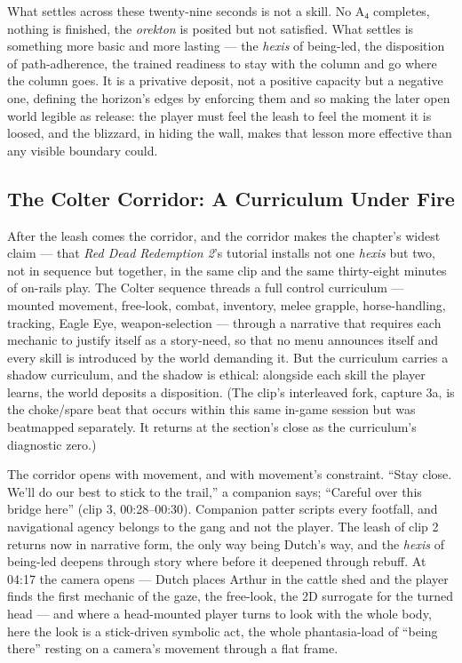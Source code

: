 \documentclass{article}
\begin{document}
What settles across these twenty-nine seconds is not a skill. No A₄ completes, nothing is finished, the \textit{orekton} is posited but not satisfied. What settles is something more basic and more lasting — the \textit{hexis} of being-led, the disposition of path-adherence, the trained readiness to stay with the column and go where the column goes. It is a privative deposit, not a positive capacity but a negative one, defining the horizon's edges by enforcing them and so making the later open world legible as release: the player must feel the leash to feel the moment it is loosed, and the blizzard, in hiding the wall, makes that lesson more effective than any visible boundary could.

\bigskip

\subsection*{The Colter Corridor: A Curriculum Under Fire}

After the leash comes the corridor, and the corridor makes the chapter's widest claim — that \textit{Red Dead Redemption 2}'s tutorial installs not one \textit{hexis} but two, not in sequence but together, in the same clip and the same thirty-eight minutes of on-rails play. The Colter sequence threads a full control curriculum — mounted movement, free-look, combat, inventory, melee grapple, horse-handling, tracking, Eagle Eye, weapon-selection — through a narrative that requires each mechanic to justify itself as a story-need, so that no menu announces itself and every skill is introduced by the world demanding it. But the curriculum carries a shadow curriculum, and the shadow is ethical: alongside each skill the player learns, the world deposits a disposition. (The clip's interleaved fork, capture 3a, is the choke/spare beat that occurs within this same in-game session but was beatmapped separately. It returns at the section's close as the curriculum's diagnostic zero.)

The corridor opens with movement, and with movement's constraint. ``Stay close. We'll do our best to stick to the trail,'' a companion says; ``Careful over this bridge here'' (clip 3, 00:28–00:30). Companion patter scripts every footfall, and navigational agency belongs to the gang and not the player. The leash of clip 2 returns now in narrative form, the only way being Dutch's way, and the \textit{hexis} of being-led deepens through story where before it deepened through rebuff. At 04:17 the camera opens — Dutch places Arthur in the cattle shed and the player finds the first mechanic of the gaze, the free-look, the 2D surrogate for the turned head — and where a head-mounted player turns to look with the whole body, here the look is a stick-driven symbolic act, the whole phantasia-load of ``being there'' resting on a camera's movement through a flat frame.
\end{document}
